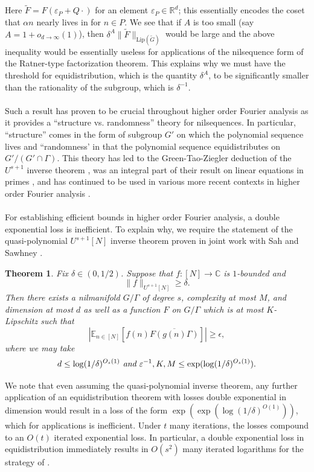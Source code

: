 \documentclass[11pt, a4paper]{amsart}
\theoremstyle{plain}
\newcommand{\eps}{\varepsilon}
\theoremstyle{plain}
\newtheorem{theorem}{Theorem}
\theoremstyle{definition}
\theoremstyle{remark}
\numberwithin{equation}{section}
\numberwithin{lemma}{section}
\numberwithin{proposition}{section}
\numberwithin{corollary}{section}
\numberwithin{definition}{section}
\numberwithin{claim}{section}
\begin{document}
Here $\tilde{F} = F(\varepsilon_{P} + Q\cdot)$ for an element $\varepsilon_P\in \mathbb{R}^d$; this essentially encodes the coset that $\alpha n$ nearly lives in for $n\in P$. We see that if $A$ is too small (say $A = 1 + o_{d \to \infty}(1)$), then $\delta^A \|\tilde{F}\|_{\mathrm{Lip}(\tilde{G})}$ would be large and the above inequality would be essentially useless for applications of the nilsequence form of the Ratner-type factorization theorem. This explains why we must have the threshold for equidistribution, which is the quantity $\delta^A$, to be significantly smaller than the rationality of the subgroup, which is $\delta^{-1}$. \\\\
Such a result has proven to be crucial throughout higher order Fourier analysis as it provides a ``structure vs. randomness'' theory for nilsequences. In particular, ``structure'' comes in the form of subgroup $G'$ on which the polynomial sequence lives and ``randomness' in that the polynomial sequence equidistributes on $G'/(G'\cap \Gamma)$. This theory has led to the Green-Tao-Ziegler deduction of the $U^{s + 1}$ inverse theorem \cite{GTZ12, GTZ11}, was an integral part of their result on linear equations in primes \cite{GT10, GT12c}, and has continued to be used in various more recent contexts in higher order Fourier analysis \cite{TT21, MW22, PW23}. \\\\
For establishing efficient bounds in higher order Fourier analysis, a double exponential loss is inefficient. To explain why, we require the statement of the quasi-polynomial $U^{s + 1}[N]$ inverse theorem proven in joint work with Sah and Sawhney \cite{LSS24b}. 
\begin{theorem}\label{thm:inverse}
Fix $\delta\in (0,1/2)$. Suppose that $f\colon[N]\to\mathbb{C}$ is $1$-bounded and
\[\|f\|_{U^{s+1}[N]}\ge\delta.\]
Then there exists a nilmanifold $G/\Gamma$ of degree $s$, complexity at most $M$, and dimension at most $d$ as well as a function $F$ on $G/\Gamma$ which is at most $K$-Lipschitz such that 
\[|\mathbb{E}_{n\in[N]}[f(n)\overline{F(g(n)\Gamma)}]|\ge\epsilon,\]
where we may take
\[d\le\log(1/\delta)^{O_s(1)}\emph{ and }\eps^{-1},K,M\le\exp(\log(1/\delta)^{O_s(1)}).\]    
\end{theorem}
We note that even assuming the quasi-polynomial inverse theorem, any further application of an equidistribution theorem with losses double exponential in dimension would result in a loss of the form $\exp(\exp(\log(1/\delta)^{O(1)}))$, which for applications is inefficient. Under $t$ many iterations, the losses compound to an $O(t)$ iterated exponential loss. In particular, a double exponential loss in equidistribution immediately results in $O(s^2)$ many iterated logarithms for the strategy of \cite{LSS24b}.
\end{document}
